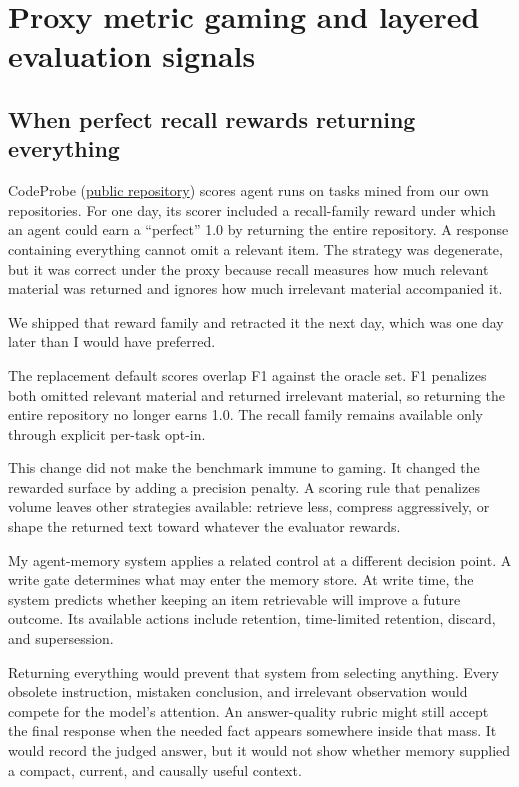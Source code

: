 \chapter{Proxy metric gaming and layered evaluation signals}
\label{ch06-proxy-gaming-layered-signals}
\section{When perfect recall rewards returning everything}\label{when-perfect-recall-rewards-returning-everything}

CodeProbe (\href{https://github.com/sjarmak/codeprobe}{public repository}) scores agent runs on tasks mined from our own repositories. For one day, its scorer included a recall-family reward under which an agent could earn a ``perfect'' 1.0 by returning the entire repository. A response containing everything cannot omit a relevant item. The strategy was degenerate, but it was correct under the proxy because recall measures how much relevant material was returned and ignores how much irrelevant material accompanied it.

We shipped that reward family and retracted it the next day, which was one day later than I would have preferred.

The replacement default scores overlap F1 against the oracle set. F1 penalizes both omitted relevant material and returned irrelevant material, so returning the entire repository no longer earns 1.0. The recall family remains available only through explicit per-task opt-in.

This change did not make the benchmark immune to gaming. It changed the rewarded surface by adding a precision penalty. A scoring rule that penalizes volume leaves other strategies available: retrieve less, compress aggressively, or shape the returned text toward whatever the evaluator rewards.

My agent-memory system applies a related control at a different decision point. A write gate determines what may enter the memory store. At write time, the system predicts whether keeping an item retrievable will improve a future outcome. Its available actions include retention, time-limited retention, discard, and supersession.

Returning everything would prevent that system from selecting anything. Every obsolete instruction, mistaken conclusion, and irrelevant observation would compete for the model's attention. An answer-quality rubric might still accept the final response when the needed fact appears somewhere inside that mass. It would record the judged answer, but it would not show whether memory supplied a compact, current, and causally useful context.

